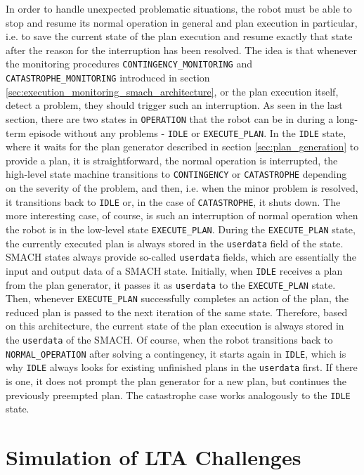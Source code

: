 \documentclass[english, master, utf8]{base/thesis_KBS}
\newcommand{\code}[1]{\colorbox{light-gray}{\texttt{#1}}}
\begin{document}
In order to handle unexpected problematic situations, the robot must be able to stop and resume its normal operation in general
and plan execution in particular, i.e. to save the current state of the plan execution and resume exactly that state after the reason
for the interruption has been resolved. The idea is that whenever the monitoring procedures \code{CONTINGENCY\_MONITORING} and \code{CATASTROPHE\_MONITORING} 
introduced in section \ref{sec:execution_monitoring_smach_architecture}, or the plan execution itself, detect a problem, they should trigger such an interruption.
As seen in the last section, there are two states in \code{OPERATION} that the robot can be in during a long-term episode without any problems
- \code{IDLE} or \code{EXECUTE\_PLAN}. In the \code{IDLE} state, where it waits for the plan generator described in section \ref{sec:plan_generation} to provide a plan,
it is straightforward, the normal operation is interrupted, the high-level state machine transitions to \code{CONTINGENCY} or \code{CATASTROPHE} depending
on the severity of the problem, and then, i.e. when the minor problem is resolved, it transitions back to \code{IDLE} or, in the case of \code{CATASTROPHE},
it shuts down. The more interesting case, of course, is such an interruption of normal operation when the robot is in the low-level state \code{EXECUTE\_PLAN}.
During the \code{EXECUTE\_PLAN} state, the currently executed plan is always stored in the \code{userdata} field of the state.
SMACH states always provide so-called \code{userdata} fields, which are essentially the input and output data of a SMACH state.
Initially, when \code{IDLE} receives a plan from the plan generator, it passes it as \code{userdata} to the \code{EXECUTE\_PLAN} state.
Then, whenever \code{EXECUTE\_PLAN} successfully completes an action of the plan, the reduced plan is passed to the next iteration of the same state.
Therefore, based on this architecture, the current state of the plan execution is always stored in the \code{userdata} of the SMACH.
Of course, when the robot transitions back to \code{NORMAL\_OPERATION} after solving a contingency, it starts again in \code{IDLE}, which is why \code{IDLE} 
always looks for existing unfinished plans in the \code{userdata} first. If there is one, it does not prompt the plan generator for a new plan, but continues the previously 
preempted plan. The catastrophe case works analogously to the \code{IDLE} state.

\section{Simulation of LTA Challenges}
\label{sec:simulation_of_lta_challenges}
\end{document}
